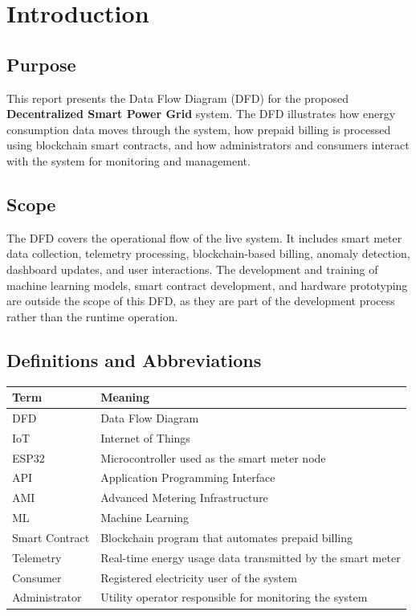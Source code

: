 \section{Introduction}

\subsection{Purpose}

This report presents the Data Flow Diagram (DFD) for the proposed
\textbf{Decentralized Smart Power Grid} system. The DFD illustrates how
energy consumption data moves through the system, how prepaid billing is
processed using blockchain smart contracts, and how administrators and
consumers interact with the system for monitoring and management.

\subsection{Scope}

The DFD covers the operational flow of the live system. It includes
smart meter data collection, telemetry processing, blockchain-based
billing, anomaly detection, dashboard updates, and user interactions.
The development and training of machine learning models, smart contract
development, and hardware prototyping are outside the scope of this DFD,
as they are part of the development process rather than the runtime
operation.

\subsection{Definitions and Abbreviations}

\renewcommand{\arraystretch}{1.3}
\begin{tabular}{|p{3cm}|p{10cm}|}
\hline
\textbf{Term} & \textbf{Meaning} \\ \hline
DFD & Data Flow Diagram \\ \hline
IoT & Internet of Things \\ \hline
ESP32 & Microcontroller used as the smart meter node \\ \hline
API & Application Programming Interface \\ \hline
AMI & Advanced Metering Infrastructure \\ \hline
ML & Machine Learning \\ \hline
Smart Contract & Blockchain program that automates prepaid billing \\ \hline
Telemetry & Real-time energy usage data transmitted by the smart meter \\ \hline
Consumer & Registered electricity user of the system \\ \hline
Administrator & Utility operator responsible for monitoring the system \\ \hline
\end{tabular}